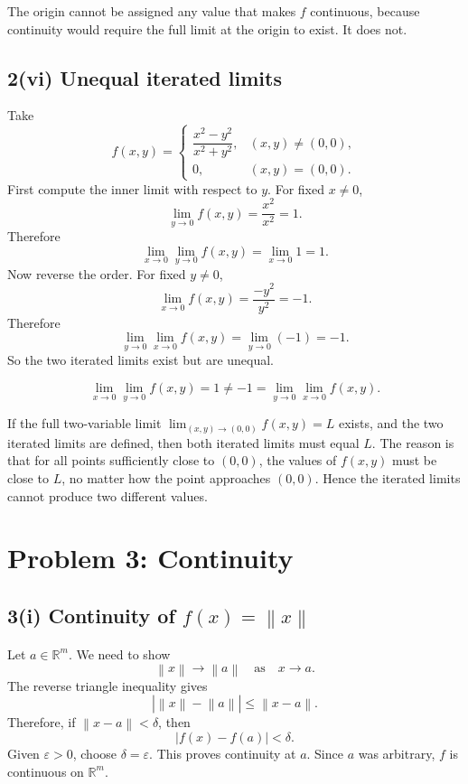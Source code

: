 \documentclass[11pt]{article}
\newcommand{\R}{\mathbb{R}}
\newcommand{\norm}[1]{\left\lVert #1 \right\rVert}
\newcommand{\abs}[1]{\left\lvert #1 \right\rvert}
\begin{document}
\begin{answerbox}
The origin cannot be assigned any value that makes \(f\) continuous, because continuity would require the full limit at the origin to exist. It does not.
\end{answerbox}

\subsection{2(vi) Unequal iterated limits}

Take
\[
f(x,y)=
\begin{cases}
\dfrac{x^2-y^2}{x^2+y^2},&(x,y)\neq(0,0),\\[6pt]
0,&(x,y)=(0,0).
\end{cases}
\]
First compute the inner limit with respect to \(y\). For fixed \(x\neq0\),
\[
\lim_{y\to0}f(x,y)=\frac{x^2}{x^2}=1.
\]
Therefore
\[
\lim_{x\to0}\lim_{y\to0}f(x,y)=\lim_{x\to0}1=1.
\]
Now reverse the order. For fixed \(y\neq0\),
\[
\lim_{x\to0}f(x,y)=\frac{-y^2}{y^2}=-1.
\]
Therefore
\[
\lim_{y\to0}\lim_{x\to0}f(x,y)=\lim_{y\to0}(-1)=-1.
\]
So the two iterated limits exist but are unequal.

\begin{answerbox}
\[
\boxed{\lim_{x\to0}\lim_{y\to0}f(x,y)=1\neq -1=\lim_{y\to0}\lim_{x\to0}f(x,y).}
\]
\end{answerbox}

If the full two-variable limit \(\lim_{(x,y)\to(0,0)}f(x,y)=L\) exists, and the two iterated limits are defined, then both iterated limits must equal \(L\). The reason is that for all points sufficiently close to \((0,0)\), the values of \(f(x,y)\) must be close to \(L\), no matter how the point approaches \((0,0)\). Hence the iterated limits cannot produce two different values.

\newpage
\section{Problem 3: Continuity}

\subsection{3(i) Continuity of \(f(x)=\norm{x}\)}

Let \(a\in\R^m\). We need to show
\[
\norm{x}\to\norm{a}\quad\text{as}\quad x\to a.
\]
The reverse triangle inequality gives
\[
\abs{\norm{x}-\norm{a}}\leq\norm{x-a}.
\]
Therefore, if \(\norm{x-a}<\delta\), then
\[
\abs{f(x)-f(a)}<\delta.
\]
Given \(\varepsilon>0\), choose \(\delta=\varepsilon\). This proves continuity at \(a\). Since \(a\) was arbitrary, \(f\) is continuous on \(\R^m\).
\end{document}
